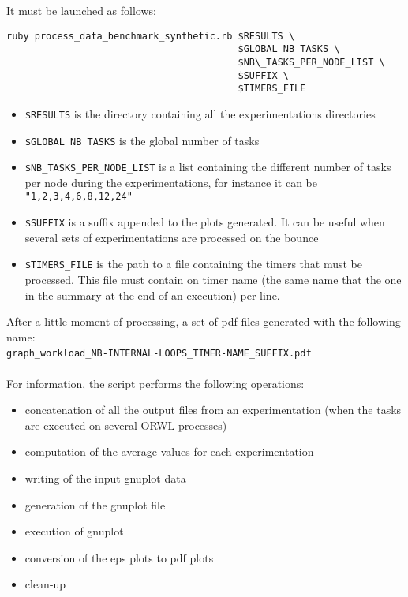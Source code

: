 \documentclass[10pt]{article}
\begin{document}
It must be launched as follows:
\begin{verbatim}
ruby process_data_benchmark_synthetic.rb $RESULTS \
                                         $GLOBAL_NB_TASKS \
                                         $NB\_TASKS_PER_NODE_LIST \
                                         $SUFFIX \
                                         $TIMERS_FILE
\end{verbatim}
\begin{itemize}
\item \texttt{\$RESULTS} is the directory containing all the
  experimentations directories
\item \texttt{\$GLOBAL\_NB\_TASKS} is the global number of tasks
\item \texttt{\$NB\_TASKS\_PER\_NODE\_LIST} is a list containing the
  different number of tasks per node during the experimentations, for
  instance it can be \texttt{"1,2,3,4,6,8,12,24"}
\item \texttt{\$SUFFIX} is a suffix appended to the plots
  generated. It can be useful when several sets of experimentations
  are processed on the bounce
\item \texttt{\$TIMERS\_FILE} is the path to a file containing the
  timers that must be processed. This file must contain on timer name
  (the same name that the one in the summary at the end of an
  execution) per line.
\end{itemize}

After a little moment of processing, a set of pdf files generated with
the following name:\\
\texttt{graph\_workload\_NB-INTERNAL-LOOPS\_TIMER-NAME\_SUFFIX.pdf}
~\\\\
For information, the script performs the following operations:
\begin{itemize}
\item concatenation of all the output files from an experimentation (when
  the tasks are executed on several ORWL processes)
\item computation of the average values for each experimentation
\item writing of the input gnuplot data
\item generation of the gnuplot file
\item execution of gnuplot
\item conversion of the eps plots to pdf plots
\item clean-up
\end{itemize}
\end{document}
